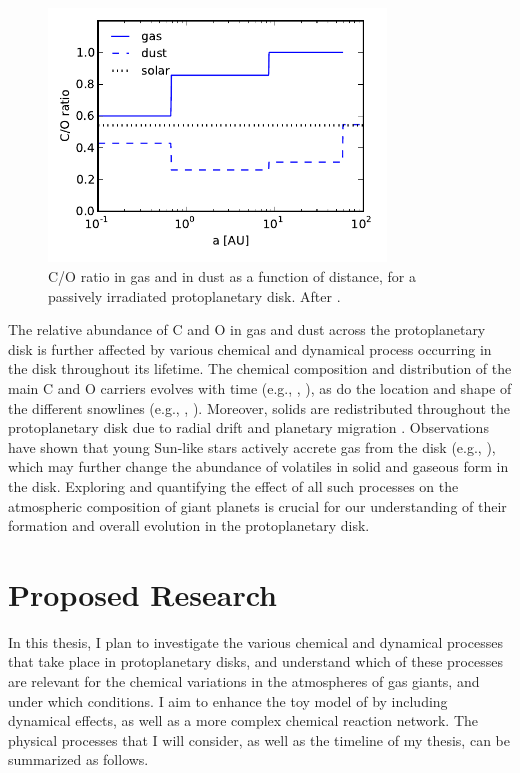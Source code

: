 \documentclass[manuscript]{aastex}
\begin{document}
\begin{figure}[htb]
\centering
\includegraphics[width=0.8\textwidth]{../figs/C_O_ratio_2.pdf}
\caption{C/O ratio in gas and in dust as a function of distance, for a passively irradiated protoplanetary disk. After \citet{oberg11}.} %
\label{fig:CtoO}
\end{figure}

The relative abundance of C and O in gas and dust across the protoplanetary disk is further affected by various chemical and dynamical process occurring in the disk throughout its lifetime. The chemical composition and distribution of the main C and O carriers evolves with time (e.g., \citealt{ciesla06}, \citealt{visser09}), as do the location and shape of the different snowlines (e.g., \citealt{garaud07}, \citealt{stevenson88}). Moreover, solids are redistributed throughout the protoplanetary disk due to radial drift \citep{chiang10} and planetary migration \citep{armitage10}. Observations have shown that young Sun-like stars actively accrete gas from the disk (e.g., \citealt{hartmann06}), which may further change the abundance of volatiles in solid and gaseous form in the disk. Exploring and quantifying the effect of all such processes on the atmospheric composition of giant planets is crucial for our understanding of their formation and overall evolution in the protoplanetary disk. 

\section{Proposed Research}

In this thesis, I plan to investigate the various chemical and dynamical processes that take place in protoplanetary disks, and understand which of these processes are relevant for the chemical variations in the atmospheres of gas giants, and under which conditions. I aim to enhance the toy model of \citet{oberg11} by including dynamical effects, as well as a more complex chemical reaction network. The physical processes that I will consider, as well as the timeline of my thesis, can be summarized as follows. 
\end{document}
